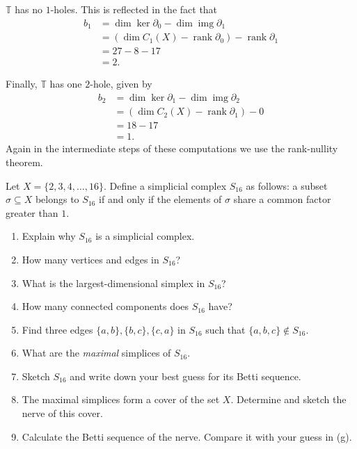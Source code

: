 \documentclass[12 pt, letterpaper]{hmcpset}
\begin{document}
\begin{solution}
			$\mathbb{T}$ has no $1$-holes. This is reflected in the fact that
			\begin{align*}
				b_{1} & = \dim \ker \partial_{0} - \dim \operatorname{img} \partial_{1} \\
				      & = (\dim C_{1}(X) - \operatorname{rank} \partial_{0}) - \operatorname{rank} \partial_{1} \\
				      & = 27 - 8 - 17 \\
				      & = 2.
			\end{align*}

			Finally, $\mathbb{T}$ has one $2$-hole, given by
			\begin{align*}
				b_{2} & = \dim \ker \partial_{1} - \dim \operatorname{img} \partial_{2} \\
				      & = (\dim C_{2}(X) - \operatorname{rank} \partial_{1}) - 0 \\
				      & = 18 - 17 \\
				      & = 1.
			\end{align*}
			Again in the intermediate steps of these computations we use the rank-nullity theorem.

\end{solution}

\pagebreak

\begin{problem}[63.]
	Let $X = \{ 2, 3, 4, \dots, 16 \}$. Define a simplicial complex $S_{16}$ as follows: a subset $\sigma \subseteq X$ belongs to $S_{16}$ if and only if the elements of $\sigma$ share a common factor greater than $1$.
	\begin{enumerate}
		\item Explain why $S_{16}$ is a simplicial complex.

		\item How many vertices and edges in $S_{16}$?

		\item What is the largest-dimensional simplex in $S_{16}$?

		\item How many connected components does $S_{16}$ have?

		\item Find three edges $\{ a, b \}, \{ b, c \}, \{ c, a \}$ in $S_{16}$ such that $\{ a, b, c \} \notin S_{16}$.

		\item What are the \emph{maximal} simplices of $S_{16}$.

		\item Sketch $S_{16}$ and write down your best guess for its Betti sequence.

		\item The maximal simplices form a cover of the set $X$. Determine and sketch the nerve of this cover.

		\item Calculate the Betti sequence of the nerve. Compare it with your guess in (g).
	\end{enumerate}
\end{problem}
\end{document}
